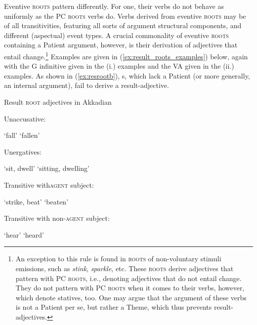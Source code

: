 \documentclass[output=paper,colorlinks,citecolor=brown]{langscibook}
\begin{document}
 Eventive \textsc{roots} pattern differently. For one, their verbs do not behave as uniformly as the PC \textsc{roots} verbs do. Verbs derived from eventive \textsc{roots} may be of all transitivities, featuring all sorts of argument structural components, and different (aspectual) event types. A crucial commonality of eventive \textsc{roots} containing a Patient argument, however, is their derivation of adjectives that entail change.\footnote{An exception to this rule is found in \textsc{roots} of non-voluntary stimuli emissions, such as \textit{stink}, \textit{sparkle}, etc. These \textsc{roots} derive adjectives that pattern with PC \textsc{roots}, i.e., denoting adjectives that do not entail change. They do not pattern with PC \textsc{roots} when it comes to their verbs, however, which denote statives, too. One may argue that the argument of these verbs is not a Patient per se, but rather a Theme, which thus prevents result-adjectives.} Examples are given in (\ref{ex:result_roots_examples}) below, again with the G infinitive given in the (i.) examples and the VA given in the (ii.) examples. As shown in (\ref{ex:resrootb}), s, which lack a Patient (or more generally, an internal argument), fail to derive a result-adjective.

\begin{exe}  \ex Result \textsc{root} adjectives in Akkadian\label{ex:result_roots_examples}
\begin{xlist}
    \ex Unaccusative: 
    \begin{xlist}
        \ex  {} `fall'
        \ex  {} `fallen'
    \end{xlist}
 \ex Unergatives:  \label{ex:resrootb}
 \begin{xlist}
      \ex {} `sit, dwell'
     \ex {} `sitting, dwelling'
 \end{xlist}
    \ex  Transitive with\textsc{agent} subject: 
    \begin{xlist} \ex 
        `strike, beat'
      \ex  {} `beaten'
      \end{xlist}
     \ex Transitive with non-\textsc{agent} subject: \label{ex:šemû}
     \begin{xlist}
         \ex    {} `hear'
     \ex {} `heard'
     \end{xlist}
\end{xlist} 
\end{exe} 
\end{document}
